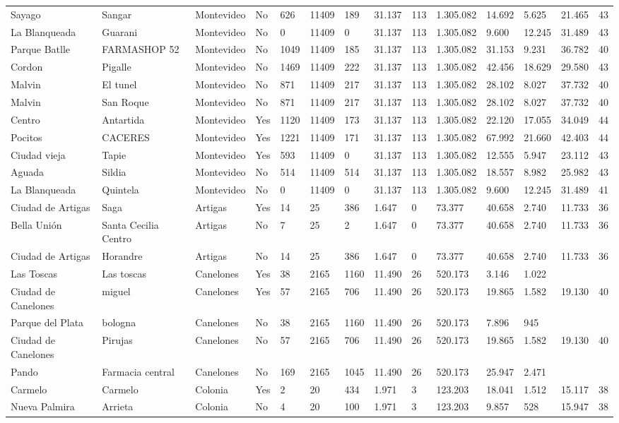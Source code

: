 \documentclass[11pt]{article}
\begin{document}
\begin{landscape}
\begin{longtable}[htbp]{@{}p{1.2cm}p{1cm}p{1.5cm}p{1cm}p{1cm}p{1cm}p{1cm}p{1cm}p{1cm}p{1cm}p{1cm}p{1.2cm}p{1cm}p{1cm}@{}}
Sayago	&	Sangar	&	Montevideo	&	No	&	626	&	11409	&	189	&	31.137	&	113	&	1.305.082	&	14.692	&	5.625	&	21.465	&	43	\tabularnewline
La Blanqueada	&	Guarani	&	Montevideo	&	No	&	0	&	11409	&	0	&	31.137	&	113	&	1.305.082	&	9.600	&	12.245	&	31.489	&	43	\tabularnewline
Parque Batlle	&	FARMASHOP 52	&	Montevideo	&	No	&	1049	&	11409	&	185	&	31.137	&	113	&	1.305.082	&	31.153	&	9.231	&	36.782	&	40	\tabularnewline
Cordon	&	Pigalle	&	Montevideo	&	No	&	1469	&	11409	&	222	&	31.137	&	113	&	1.305.082	&	42.456	&	18.629	&	29.580	&	43	\tabularnewline
Malvin	&	El tunel	&	Montevideo	&	No	&	871	&	11409	&	217	&	31.137	&	113	&	1.305.082	&	28.102	&	8.027	&	37.732	&	40	\tabularnewline
Malvin	&	San Roque	&	Montevideo	&	No	&	871	&	11409	&	217	&	31.137	&	113	&	1.305.082	&	28.102	&	8.027	&	37.732	&	40	\tabularnewline
Centro	&	Antartida	&	Montevideo	&	Yes	&	1120	&	11409	&	173	&	31.137	&	113	&	1.305.082	&	22.120	&	17.055	&	34.049	&	44	\tabularnewline
Pocitos	&	CACERES	&	Montevideo	&	Yes	&	1221	&	11409	&	171	&	31.137	&	113	&	1.305.082	&	67.992	&	21.660	&	42.403	&	44	\tabularnewline
Ciudad vieja	&	Tapie	&	Montevideo	&	Yes	&	593	&	11409	&	0	&	31.137	&	113	&	1.305.082	&	12.555	&	5.947	&	23.112	&	43	\tabularnewline
Aguada	&	Sildia	&	Montevideo	&	No	&	514	&	11409	&	514	&	31.137	&	113	&	1.305.082	&	18.557	&	8.982	&	25.982	&	43	\tabularnewline
La Blanqueada	&	Quintela	&	Montevideo	&	No	&	0	&	11409	&	0	&	31.137	&	113	&	1.305.082	&	9.600	&	12.245	&	31.489	&	41	\tabularnewline
Ciudad de Artigas	&	Saga	&	Artigas	&	Yes	&	14	&	25	&	386	&	1.647	&	0	&	73.377	&	40.658	&	2.740	&	11.733	&	36	\tabularnewline
Bella Unión	&	Santa Cecilia Centro	&	Artigas	&	No	&	7	&	25	&	2	&	1.647	&	0	&	73.377	&	40.658	&	2.740	&	11.733	&	36	\tabularnewline
Ciudad de Artigas	&	Horandre	&	Artigas	&	No	&	14	&	25	&	386	&	1.647	&	0	&	73.377	&	40.658	&	2.740	&	11.733	&	36	\tabularnewline
Las Toscas	&	Las toscas	&	Canelones	&	Yes	&	38	&	2165	&	1160	&	11.490	&	26	&	520.173	&	3.146	&	1.022	&		&		\tabularnewline
Ciudad de Canelones	&	miguel	&	Canelones	&	Yes	&	57	&	2165	&	706	&	11.490	&	26	&	520.173	&	19.865	&	1.582	&	19.130	&	40	\tabularnewline
Parque del Plata	&	bologna	&	Canelones	&	No	&	38	&	2165	&	1160	&	11.490	&	26	&	520.173	&	7.896	&	945	&		&		\tabularnewline
Ciudad de Canelones	&	Pirujas	&	Canelones	&	No	&	57	&	2165	&	706	&	11.490	&	26	&	520.173	&	19.865	&	1.582	&	19.130	&	40	\tabularnewline
Pando	&	Farmacia central	&	Canelones	&	No	&	169	&	2165	&	1045	&	11.490	&	26	&	520.173	&	25.947	&	2.471	&		&		\tabularnewline
Carmelo	&	Carmelo	&	Colonia	&	Yes	&	2	&	20	&	434	&	1.971	&	3	&	123.203	&	18.041	&	1.512	&	15.117	&	38	\tabularnewline
Nueva Palmira	&	Arrieta	&	Colonia	&	No	&	4	&	20	&	100	&	1.971	&	3	&	123.203	&	9.857	&	528	&	15.947	&	38	\tabularnewline

\end{longtable}
\end{landscape}
\end{document}

